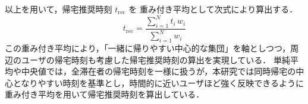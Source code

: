 以上を用いて，帰宅推奨時刻 $t_{\mathrm{rec}}$ を
重み付き平均として次式により算出する．
\[
  t_{\mathrm{rec}} =
  \frac{\sum_{i=1}^{N} t_i \, w_i}
  {\sum_{i=1}^{N} w_i}
\]
この重み付き平均により，「一緒に帰りやすい中心的な集団」を軸としつつ，周辺のユーザの帰宅時刻も考慮した帰宅推奨時刻の算出を実現している．
単純平均や中央値では，全滞在者の帰宅時刻を一様に扱うが，本研究では同時帰宅の中心となりやすい時刻を基準とし，時間的に近いユーザほど強く反映できるように重み付き平均を用いて帰宅推奨時刻を算出している．


%

%

%
